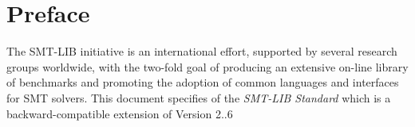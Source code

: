

\chapter*{Preface}


The SMT-LIB initiative is an international effort, 
supported by several research groups worldwide, 
with the two-fold goal of producing an extensive on-line library of benchmarks and
promoting the adoption of common languages and interfaces for SMT solvers. 
This document specifies \thisversion of the \emph{SMT-LIB Standard}
which is a backward-compatible extension of Version 2..6
\medskip

\thispagestyle{empty}
